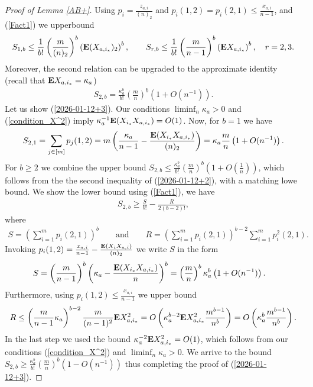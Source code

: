 \documentclass[10pt,a4paper]{amsart}
\newcommand{\E}{{\bf{E}}}
\begin{document}
\begin{proof}[ Proof of Lemma \ref{AB+}]
Using
$p_i=\frac{z_{a,i}}{(n)_2}$ 
and
$p_i(1,2)
=
p_i(2,1)
\le 
\frac{x_{a,i}}{n-1}$, 
and (\ref{Fact1}) we upperbound
\begin{align}
\label{2026-01-12+2}
S_{1,b}
\le 
\frac{1}{b!}
\left(\frac{m}{(n)_2}\right)^b
\left(
\E(X_{a,i_*})_2
\right)^b,
\qquad
S_{r,b}
\le 
\frac{1}{b!}
\left(\frac{m}{n-1}\right)^b
\left(
\E X_{a,i_*}
\right)^b,
\quad
r=2,3.
\end{align}
 Moreover, 
the second relation can be upgraded
to the approximate identity (recall that $\E X_{a,i_*}=\kappa_a$)
\begin{align}
\label{2026-01-12+3}
S_{2,b}
=
 \frac{\kappa_a^b}{b!}\left(\frac{m}{n}\right)^b
 \left(1+O(n^{-1})\right).
\end{align}
Let us show (\ref{2026-01-12+3}). 
Our conditions $\liminf_n\kappa_a>0$ and (\ref{condition_X^2}) imply 
$\kappa_a^{-1}\E(X_{i_*}X_{a,i_*})=O(1)$.
Now, for $b=1$ we have 
\begin{align*}
S_{2,1}
=
\sum_{j\in [m]}p_j(1,2)
=m\left(\frac{\kappa_a}{n-1}-\frac{\E (X_{i_*}X_{a,i_*})}{(n)_2}\right)
=
\kappa_a
\frac{m}{n}
\left(
1
+
O(n^{-1})
\right).
\end{align*}
For $b\ge 2$ 
 we combine 
 the upper bound 
$S_{2,b}
\le
\frac{\kappa_a^b}{b!}
\left(\frac{m}{n}\right)^b
\left(1+O\left(\frac{1}{n}\right)\right)$,
which 
follows from the the second inequality of 
(\ref{2026-01-12+2}), with a matching lowe bound. We show
the
lower bound using 
(\ref{Fact1}), we have
\begin{align*}
S_{2,b}
\ge \frac{S}{b!}-\frac{R}{2(b-2)!},
\end{align*}
where
\begin{align*}
S=\left(
\sum_{i=1}^mp_i(2,1)\right)^b
\qquad
{\text{and}}
\qquad
R=\left(
\sum_{i=1}^mp_i(2,1)\right)^{b-2}
\sum_{i=1}^mp_i^2(2,1).
\end{align*}
Invoking 
$p_i(1,2)= \frac{x_{a,i}}{n-1}-\frac{\E (X_iX_{a,i})}{(n)_2}$
we write $S$ in the form 
\begin{align*}
S
&
=
\left(\frac{m}{n-1}\right)^b
\left(\kappa_a-\frac{\E(X_{i_*}X_{a,i_*})}{n}\right)^b
=
\left(\frac{m}{n}\right)^b
\kappa_a^b 
\left(1+O(n^{-1})\right).
\end{align*}
Furthermore, using  
$p_i(1,2)\le \frac{x_{a,i}}{n-1}$ 
we upper bound
\begin{align*}
R
\le 
\left(\frac{m}{n-1}\kappa_a\right)^{b-2}
\frac{m}{(n-1)^2}\E X^2_{a,i_*}
=
O\left(\kappa_a^{b-2}\E X_{a,i_*}^2
\frac{m^{b-1}}{n^b}\right)
=
O\left(\kappa_a^b
\frac{m^{b-1}}{n^b}\right).
\end{align*}
In the last step we used the bound
$\kappa_a^{-2}\E X_{a,i_*}^2=O(1)$, which follows from 
our conditions
(\ref{condition_X^2})  and
$\liminf_n\kappa_a>0$.
We arrive to the bound 
$S_{2,b}
\ge 
\frac{\kappa_a^b}{b!}
\left(\frac{m}{n}\right)^b
\left(
1
-
O(n^{-1})
\right)$
thus completing the proof of
(\ref{2026-01-12+3}).


\end{proof}
\end{document}
